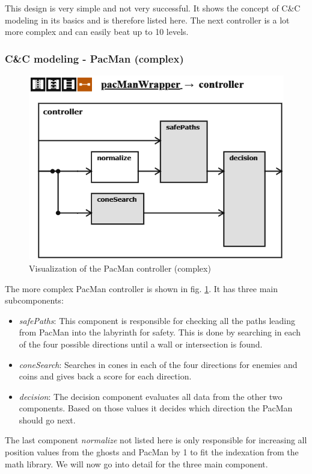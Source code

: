 This design is very simple and not very successful. It shows the concept of C\&C modeling in its basics and is therefore listed here. The next controller is a lot more complex and can easily beat up to 10 levels.

\subsubsection{C\&C modeling - PacMan (complex)}
\begin{figure}
	\label{fig:visPacman20}
	\centering
	\includegraphics[scale=0.85]{pictures/PacMan/Controller20.png}
	\caption{Visualization of the PacMan controller (complex)}
\end{figure}

The more complex PacMan controller is shown in fig. \ref{fig:visPacman20}.
It has three main subcomponents:
\begin{itemize}
	\item \textit{safePaths}: This component is responsible for checking all the paths leading from PacMan into the labyrinth for safety. This is done by searching in each of the four possible directions until a wall or intersection is found.	
	\item \textit{coneSearch}: Searches in cones in each of the four directions for enemies and coins and gives back a score for each direction.	
	\item \textit{decision}: The decision component evaluates all data from the other two components. Based on those values it decides which direction the PacMan should go next.	
\end{itemize}
The last component \textit{normalize} not listed here is only responsible for increasing all position values from the ghosts and PacMan by 1 to fit the indexation from the math library.
We will now go into detail for the three main component.
\newline

